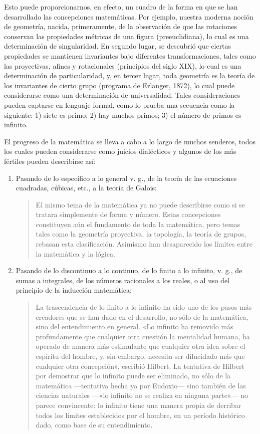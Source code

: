 \documentclass[a4paper, 12pt]{article}
\begin{document}
{{Esto puede proporcionarnos, en efecto, un cuadro de la forma en que se han
desarrollado las concepciones matemáticas. Por ejemplo, nuestra moderna noción
de geometría, nacida, primeramente, de la observación de que las rotaciones
conservan las propiedades métricas de una figura (preeuclidiana), lo cual es una
determinación de singularidad. En segundo lugar, se descubrió que ciertas
propiedades se mantienen invariantes bajo diferentes transformaciones, tales
como las proyectivas, afines y rotacionales (principios del siglo XIX), lo cual
es una determinación de particularidad, y, en tercer lugar, toda geometría es la
teoría de los invariantes de cierto grupo (programa de Erlanger, 1872), lo cual
puede considerarse como una determinación de universalidad. Tales
consideraciones pueden captarse en lenguaje formal, como lo prueba una secuencia
como la siguiente: 1) siete es primo; 2) hay muchos primos; 3) el número de
primos es infinito.

El progreso de la matemática se lleva a cabo a lo largo de muchos senderos,
todos los cuales pueden considerarse como juicios dialécticos  y algunos de los
más fértiles pueden describirse así:

\begin{enumerate}

\item  Pasando de lo específico a lo general v. g., de la teoría de las
ecuaciones cuadradas, cúbicas, etc., a la teoría de Galois:

\begin{quote}\small El mismo tema de la matemática ya no puede describirse como
si se tratara simplemente de forma y número. Estas concepciones constituyen aún
el fundamento de toda la matemática, pero temas tales como la geometría
proyectiva, la topología, la teoría de grupos, rebasan esta clasificación.
Asimismo han desaparecido los límites entre la matemática y la lógica.
\end{quote}

\item Pasando de lo discontinuo a lo continuo, de lo finito a lo infinito, v.
g., de sumas a integrales, de los números racionales a los reales, o al uso del
principio de la inducción matemática:

\begin{quote}\small La trascendencia de lo finito a lo infinito ha sido uno de
los pasos más creadores que se han dado en el desarrollo, no sólo de la
matemática, sino del entendimiento en general. «Lo infinito ha removido más
profundamente que cualquier otra cuestión la mentalidad humana, ha operado de
manera más estimulante que cualquier otra idea sobre el espíritu del hombre, y,
sin embargo, necesita ser dilucidado más que cualquier otra concepción»,
escribió Hilbert. La tentativa de Hilbert por demostrar que lo infinito puede
ser eliminado, no sólo de la matemática ---tentativa hecha ya por Eudoxio---
sino también de las ciencias naturales ---«lo infinito no se realiza en ninguna
parte»--- no parece convincente: lo infinito tiene una manera propia de derribar
todos los límites establecidos por el hombre, en un período histórico dado, como
base de su entendimiento. \end{quote}


\end{enumerate}}}
\end{document}
